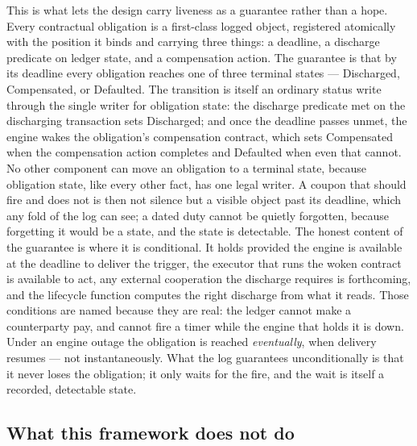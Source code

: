 This is what lets the design carry liveness as a guarantee rather than a hope. Every
contractual obligation is a first-class logged object, registered atomically with
the position it binds and carrying three things: a deadline, a discharge predicate
on ledger state, and a compensation action. The guarantee is that by its deadline
every obligation reaches one of three terminal states --- Discharged, Compensated,
or Defaulted. The transition is itself an ordinary status write through the single
writer for obligation state: the discharge predicate met on the discharging
transaction sets Discharged; and once the deadline passes unmet, the engine wakes the
obligation's compensation contract, which sets Compensated when the compensation
action completes and Defaulted when even that cannot. No other component can move an
obligation to a terminal state, because obligation state, like every other fact, has
one legal writer. A coupon that should fire and does not is then not silence but a
visible object past its deadline, which any fold of the log can see; a dated duty
cannot be quietly forgotten, because forgetting it would be a state, and the state
is detectable. The honest content of the guarantee is where it is conditional. It
holds provided the engine is available at the deadline to deliver the trigger, the
executor that runs the woken contract is available to act, any external cooperation
the discharge requires is forthcoming, and the lifecycle function computes the right
discharge from what it reads. Those conditions are named because they are real: the
ledger cannot make a counterparty pay, and cannot fire a timer while the engine that
holds it is down. Under an engine outage the obligation is reached \emph{eventually},
when delivery resumes --- not instantaneously. What the log guarantees unconditionally
is that it never loses the obligation; it only waits for the fire, and the wait is
itself a recorded, detectable state.

\subsection{What this framework does not do}

